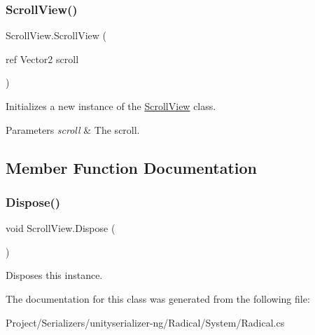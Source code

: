 \subsubsection{\texorpdfstring{Scroll\+View()}{ScrollView()}}
{\footnotesize\ttfamily Scroll\+View.\+Scroll\+View (\begin{DoxyParamCaption}\item[{ref Vector2}]{scroll }\end{DoxyParamCaption})\hspace{0.3cm}{\ttfamily [inline]}}



Initializes a new instance of the \hyperlink{class_scroll_view}{Scroll\+View} class. 


\begin{DoxyParams}{Parameters}
{\em scroll} & The scroll.\\
\hline
\end{DoxyParams}


\subsection{Member Function Documentation}
\mbox{\label{class_scroll_view_a297facb4dc5f6f2698415506b53d1b87}} 
\subsubsection{\texorpdfstring{Dispose()}{Dispose()}}
{\footnotesize\ttfamily void Scroll\+View.\+Dispose (\begin{DoxyParamCaption}{ }\end{DoxyParamCaption})\hspace{0.3cm}{\ttfamily [inline]}}



Disposes this instance. 



The documentation for this class was generated from the following file\+:\begin{DoxyCompactItemize}
\item 
Project/\+Serializers/unityserializer-\/ng/\+Radical/\+System/Radical.\+cs\end{DoxyCompactItemize}

